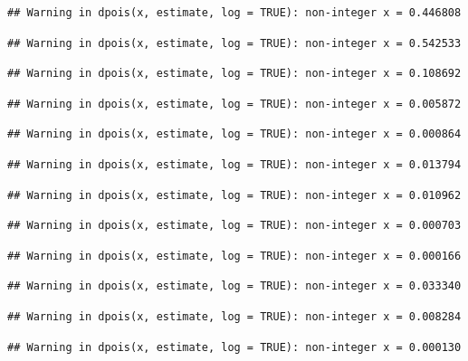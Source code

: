 \documentclass[]{article}
\begin{document}
\begin{verbatim}
## Warning in dpois(x, estimate, log = TRUE): non-integer x = 0.446808
\end{verbatim}

\begin{verbatim}
## Warning in dpois(x, estimate, log = TRUE): non-integer x = 0.542533
\end{verbatim}

\begin{verbatim}
## Warning in dpois(x, estimate, log = TRUE): non-integer x = 0.108692
\end{verbatim}

\begin{verbatim}
## Warning in dpois(x, estimate, log = TRUE): non-integer x = 0.005872
\end{verbatim}

\begin{verbatim}
## Warning in dpois(x, estimate, log = TRUE): non-integer x = 0.000864
\end{verbatim}

\begin{verbatim}
## Warning in dpois(x, estimate, log = TRUE): non-integer x = 0.013794
\end{verbatim}

\begin{verbatim}
## Warning in dpois(x, estimate, log = TRUE): non-integer x = 0.010962
\end{verbatim}

\begin{verbatim}
## Warning in dpois(x, estimate, log = TRUE): non-integer x = 0.000703
\end{verbatim}

\begin{verbatim}
## Warning in dpois(x, estimate, log = TRUE): non-integer x = 0.000166
\end{verbatim}

\begin{verbatim}
## Warning in dpois(x, estimate, log = TRUE): non-integer x = 0.033340
\end{verbatim}

\begin{verbatim}
## Warning in dpois(x, estimate, log = TRUE): non-integer x = 0.008284
\end{verbatim}

\begin{verbatim}
## Warning in dpois(x, estimate, log = TRUE): non-integer x = 0.000130
\end{verbatim}
\end{document}
